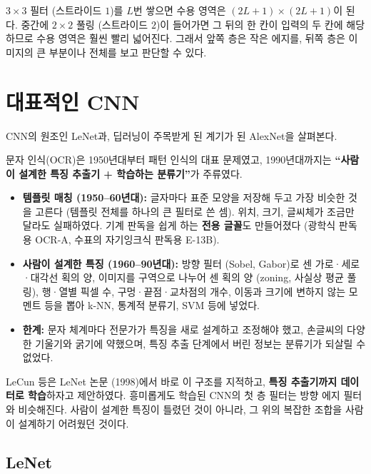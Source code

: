 \documentclass[11pt,a4paper]{article}
\begin{document}
$3\times3$ 필터 (스트라이드 $1$)를 $L$번 쌓으면 수용 영역은 $(2L+1)\times(2L+1)$이 된다.
중간에 $2\times2$ 풀링 (스트라이드 $2$)이 들어가면 그 뒤의 한 칸이 입력의 두 칸에 해당하므로 수용 영역은 훨씬 빨리 넓어진다.
그래서 앞쪽 층은 작은 에지를, 뒤쪽 층은 이미지의 큰 부분이나 전체를 보고 판단할 수 있다.

\section{대표적인 CNN}\label{sec:famous}

CNN의 원조인 LeNet과, 딥러닝이 주목받게 된 계기가 된 AlexNet을 살펴본다.

\begin{remarkbox}
문자 인식(OCR)은 1950년대부터 패턴 인식의 대표 문제였고, 1990년대까지는
\textbf{``사람이 설계한 특징 추출기 + 학습하는 분류기''}가 주류였다.
\begin{itemize}[leftmargin=1.5em]
\item \textbf{템플릿 매칭 (1950--60년대):} 글자마다 표준 모양을 저장해 두고 가장 비슷한 것을 고른다 (템플릿 전체를 하나의 큰 필터로 쓴 셈).
위치, 크기, 글씨체가 조금만 달라도 실패하였다. 기계 판독을 쉽게 하는 \textbf{전용 글꼴}도 만들어졌다
(광학식 판독용 OCR-A, 수표의 자기잉크식 판독용 E-13B).
\item \textbf{사람이 설계한 특징 (1960--90년대):} 방향 필터 (Sobel, Gabor)로 센 가로·세로·대각선 획의 양,
이미지를 구역으로 나누어 센 획의 양 (zoning, 사실상 평균 풀링), 행·열별 픽셀 수, 구멍·끝점·교차점의 개수,
이동과 크기에 변하지 않는 모멘트 등을 뽑아 k-NN, 통계적 분류기, SVM 등에 넣었다.
\item \textbf{한계:} 문자 체계마다 전문가가 특징을 새로 설계하고 조정해야 했고, 손글씨의 다양한 기울기와 굵기에 약했으며,
특징 추출 단계에서 버린 정보는 분류기가 되살릴 수 없었다.
\end{itemize}
LeCun 등은 LeNet 논문 (1998)에서 바로 이 구조를 지적하고, \textbf{특징 추출기까지 데이터로 학습}하자고 제안하였다.
흥미롭게도 학습된 CNN의 첫 층 필터는 방향 에지 필터와 비슷해진다.
사람이 설계한 특징이 틀렸던 것이 아니라, 그 위의 복잡한 조합을 사람이 설계하기 어려웠던 것이다.
\end{remarkbox}

\subsection{LeNet}\label{sec:lenet}
\end{document}
